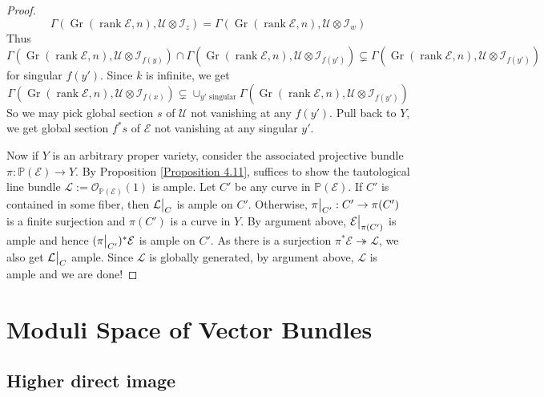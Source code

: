 \documentclass{ctexart}
\newcommand{\rank}{\operatorname{rank}}
\newcommand{\grassmannianscheme}[2]{\operatorname{Gr}(#1, #2)}
\begin{document}
\begin{proof}
\begin{equation}
        \Gamma(\grassmannianscheme{\rank \mathcal{E}}{n}, \mathcal{U} \otimes \mathcal{I}_{z}) = \Gamma(\grassmannianscheme{\rank \mathcal{E}}{n}, \mathcal{U} \otimes \mathcal{I}_{w})
    \end{equation}
    Thus $\Gamma(\grassmannianscheme{\rank \mathcal{E}}{n}, \mathcal{U} \otimes \mathcal{I}_{f(y)}) \cap \Gamma(\grassmannianscheme{\rank \mathcal{E}}{n}, \mathcal{U} \otimes \mathcal{I}_{f(y')}) \subsetneq \Gamma(\grassmannianscheme{\rank \mathcal{E}}{n}, \mathcal{U} \otimes \mathcal{I}_{f(y')})$ for singular $f(y')$.
    Since $k$ is infinite, we get
    \begin{equation}
        \Gamma(\grassmannianscheme{\rank \mathcal{E}}{n}, \mathcal{U} \otimes \mathcal{I}_{f(x)}) \subsetneq \cup_{y' \text{ singular}} \Gamma(\grassmannianscheme{\rank \mathcal{E}}{n}, \mathcal{U} \otimes \mathcal{I}_{f(y')})
    \end{equation}
    So we may pick global section $s$ of $\mathcal{U}$ not vanishing at any $f(y')$.
    Pull back to $Y$, we get global section $f^{\ast}s$ of $\mathcal{E}$ not vanishing at any singular $y'$.
    \par
    Now if $Y$ is an arbitrary proper variety, consider the associated projective bundle $\pi: \mathbb{P}(\mathcal{E}) \rightarrow Y$.
    By Proposition \ref{Proposition 4.11}, suffices to show the tautological line bundle $\mathcal{L} := \mathcal{O}_{\mathbb{P}(\mathcal{E})}(1)$ is ample.
    Let $C'$ be any curve in $\mathbb{P}(\mathcal{E})$.
    If $C'$ is contained in some fiber, then $\mathcal{L}\big{|}_{C}$ is ample on $C'$.
    Otherwise, $\pi\big{|}_{C'}: C' \rightarrow \pi(C')$ is a finite surjection and $\pi(C')$ is a curve in $Y$.
    By argument above, $\mathcal{E}\big{|}_{\pi(C')}$ is ample and hence $(\pi\big{|}_{C'})^{\ast}\mathcal{E}$ is ample on $C'$.
    As there is a surjection $\pi^{\ast}\mathcal{E} \twoheadrightarrow \mathcal{L}$, we also get $\mathcal{L}\big{|}_{C}$ ample.
    Since $\mathcal{L}$ is globally generated, by argument above, $\mathcal{L}$ is ample and we are done!
\end{proof}

\section{Moduli Space of Vector Bundles}
\label{section:Moduli_Space_of_Vector_Bundles}

\subsection{Higher direct image}
\label{subsection:Moduli_Space_of_Vector_Bundles_Higher_direct_image}
\end{document}
